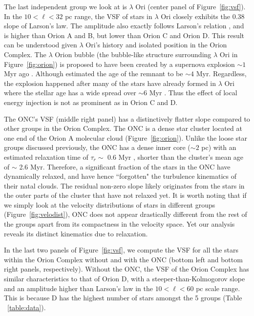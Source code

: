 The last independent group we look at is $\lambda$ Ori (center panel of Figure~\ref{fig:vsf}). In the $10<\ell<32$ pc range, the VSF of stars in $\lambda$ Ori closely exhibits the 0.38 slope of Larson's law. The amplitude also exactly follows Larson's relation \citep{larson_turbulence_1981}, and is higher than Orion A and B, but lower than Orion C and Orion D. This result can be understood given $\lambda$ Ori's history and isolated position in the Orion Complex. The $\lambda$ Orion bubble (the bubble-like structure surrounding $\lambda$ Ori in Figure~\ref{fig:orion}) is proposed to have been created by a supernova explosion $\sim1$ Myr ago \citep{dolan_photometric_2002}. Although \citet{kounkel_supernovae_2020} estimated the age of the remnant to be $\sim 4$ Myr. Regardless, the explosion happened after many of the stars have already formed in $\lambda$ Ori where the stellar age has a wide spread over $\sim 6$ Myr \citep{kounkel_apogee-2_2018}. Thus the effect of local energy injection is not as prominent as in Orion C and D.

The ONC's VSF (middle right panel) has a distinctively flatter slope compared to other groups in the Orion Complex. The ONC is a dense star cluster located at one end of the Orion A molecular cloud (Figure~\ref{fig:orion}). Unlike the loose star groups discussed previously, the ONC has a dense inner core ($\sim 2$ pc) with an estimated relaxation time of $\tau_r \sim$ 0.6 Myr \citep{hillenbrand_preliminary_1998}, shorter than the cluster's mean age of $\sim$ 2.6 Myr. Therefore, a significant fraction of the stars in the ONC have dynamically relaxed, and have hence ``forgotten" the turbulence kinematics of their natal clouds. The residual non-zero slope likely originates from the stars in the outer parts of the cluster that have not relaxed yet. It is worth noting that if we simply look at the velocity distributions of stars in different groups (Figure~\ref{fig:velodist}), ONC does not appear drastically different from the rest of the groups apart from its compactness in the velocity space. Yet our analysis reveals its distinct kinematics due to relaxation.

In the last two panels of Figure~\ref{fig:vsf}, we compute the VSF for all the stars within the Orion Complex without and with the ONC (bottom left and bottom right panels, respectively). Without the ONC, the VSF of the Orion Complex has similar characteristics to that of Orion D, with a steeper-than-Kolmogorov slope and an amplitude higher than Larson's law in the $10<\ell<60$ pc scale range. This is because D has the highest number of stars amongst the 5 groups (Table ~\ref{table:data}). 

